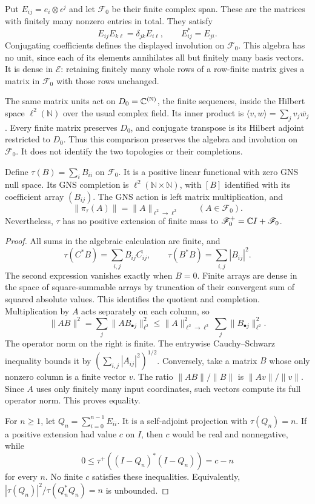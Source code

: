 Put $E_{ij}=e_i\otimes\epsilon^j$ and let $\mathscr F_0$ be their
finite complex span.  These are the matrices with finitely many nonzero
entries in total.  They satisfy
\[
 E_{ij}E_{k\ell}=\delta_{jk}E_{i\ell},\qquad
 E_{ij}^*=E_{ji}.
\]
Conjugating coefficients defines the displayed involution on
$\mathscr F_0$.  This algebra has no unit, since each of its elements
annihilates all but finitely many basis vectors.
It is dense in $\mathscr E$: retaining finitely many whole rows of a
row-finite matrix gives a matrix in $\mathscr F_0$ with those rows unchanged.

The same matrix units act on $D_0=\mathbb C^{(\mathbb N)}$, the finite sequences,
inside the Hilbert space $\ell^2(\mathbb N)$ over the usual complex field.
Its inner product is $\langle v,w\rangle=\sum_jv_j\overline{w_j}$.
Every finite matrix preserves $D_0$, and conjugate transpose is its
Hilbert adjoint restricted to $D_0$.  Thus this comparison preserves the
algebra and involution on $\mathscr F_0$.  It does not identify the two
topologies or their completions.

\begin{proposition}
\label{prop:weil-matrix-trace}
Define $\tau(B)=\sum_i B_{ii}$ on $\mathscr F_0$.
It is a positive linear functional with zero GNS null space.
Its GNS completion is $\ell^2(\mathbb N\times\mathbb N)$, with $[B]$
identified with its coefficient array $(B_{ij})$.
The GNS action is left matrix multiplication, and
\[
 \|\pi_\tau(A)\|=\|A\|_{\ell^2\to\ell^2}
 \qquad(A\in\mathscr F_0).
\]
Nevertheless, $\tau$ has no positive extension of finite mass to
$\mathscr F_0^+=\mathbb C I+\mathscr F_0$.
\end{proposition}
\begin{proof}
All sums in the algebraic calculation are finite, and
\[
 \tau(C^*B)=\sum_{i,j}B_{ij}\overline{C_{ij}},\qquad
 \tau(B^*B)=\sum_{i,j}|B_{ij}|^2.
\]
The second expression vanishes exactly when $B=0$.
Finite arrays are dense in the space of square-summable arrays by
truncation of their convergent sum of squared absolute values.
This identifies the quotient and completion.
Multiplication by $A$ acts separately on each column, so
\[
 \|AB\|^2=\sum_j\|A B_{\bullet j}\|_{\ell^2}^2
       \leq\|A\|_{\ell^2\to\ell^2}^2\sum_j\|B_{\bullet j}\|_{\ell^2}^2.
\]
The operator norm on the right is finite.  The entrywise
Cauchy--Schwarz inequality bounds it by
$(\sum_{i,j}|A_{ij}|^2)^{1/2}$.
Conversely, take a matrix $B$ whose only nonzero column is a finite
vector $v$.  The ratio $\|AB\|/\|B\|$ is $\|Av\|/\|v\|$.
Since $A$ uses only finitely many input coordinates, such vectors
compute its full operator norm.  This proves equality.

For $n\geq1$, let $Q_n=\sum_{i=0}^{n-1}E_{ii}$.
It is a self-adjoint projection with $\tau(Q_n)=n$.
If a positive extension had value $c$ on $I$, then $c$ would be real
and nonnegative, while
\[
 0\leq\tau^+((I-Q_n)^*(I-Q_n))=c-n
\]
for every $n$.  No finite $c$ satisfies these inequalities.
Equivalently,
$|\tau(Q_n)|^2/\tau(Q_n^*Q_n)=n$ is unbounded.
\end{proof}

